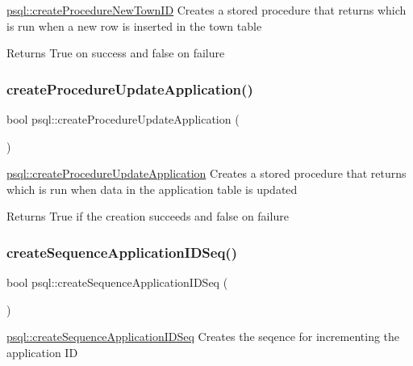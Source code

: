 \hyperlink{classpsql_ade0c7fa4f019c3f349230af09b1de49e}{psql\+::create\+Procedure\+New\+Town\+ID} Creates a stored procedure that returns which is run when a new row is inserted in the town table 

\begin{DoxyReturn}{Returns}
True on success and false on failure 
\end{DoxyReturn}
\mbox{\label{classpsql_a28f3e3d6309e3ce57493db284c099946}} 
\subsubsection{\texorpdfstring{create\+Procedure\+Update\+Application()}{createProcedureUpdateApplication()}}
{\footnotesize\ttfamily bool psql\+::create\+Procedure\+Update\+Application (\begin{DoxyParamCaption}{ }\end{DoxyParamCaption})}



\hyperlink{classpsql_a28f3e3d6309e3ce57493db284c099946}{psql\+::create\+Procedure\+Update\+Application} Creates a stored procedure that returns which is run when data in the application table is updated 

\begin{DoxyReturn}{Returns}
True if the creation succeeds and false on failure 
\end{DoxyReturn}
\mbox{\label{classpsql_a54c75d0896ee6aad58e22c830895c106}} 
\subsubsection{\texorpdfstring{create\+Sequence\+Application\+I\+D\+Seq()}{createSequenceApplicationIDSeq()}}
{\footnotesize\ttfamily bool psql\+::create\+Sequence\+Application\+I\+D\+Seq (\begin{DoxyParamCaption}{ }\end{DoxyParamCaption})}



\hyperlink{classpsql_a54c75d0896ee6aad58e22c830895c106}{psql\+::create\+Sequence\+Application\+I\+D\+Seq} Creates the seqence for incrementing the application ID 

